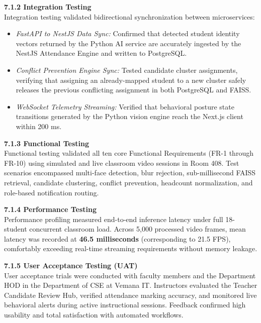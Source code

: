 \vspace{0.15in}
\noindent \textbf{7.1.2 Integration Testing} \\
Integration testing validated bidirectional synchronization between microservices:
\begin{itemize}
    \item \textit{FastAPI to NestJS Data Sync:} Confirmed that detected student identity vectors returned by the Python AI service are accurately ingested by the NestJS Attendance Engine and written to PostgreSQL.
    \item \textit{Conflict Prevention Engine Sync:} Tested candidate cluster assignments, verifying that assigning an already-mapped student to a new cluster safely releases the previous conflicting assignment in both PostgreSQL and FAISS.
    \item \textit{WebSocket Telemetry Streaming:} Verified that behavioral posture state transitions generated by the Python vision engine reach the Next.js client within 200 ms.
\end{itemize}

\vspace{0.15in}
\noindent \textbf{7.1.3 Functional Testing} \\
Functional testing validated all ten core Functional Requirements (FR-1 through FR-10) using simulated and live classroom video sessions in Room 408. Test scenarios encompassed multi-face detection, blur rejection, sub-millisecond FAISS retrieval, candidate clustering, conflict prevention, headcount normalization, and role-based notification routing.

\vspace{0.15in}
\noindent \textbf{7.1.4 Performance Testing} \\
Performance profiling measured end-to-end inference latency under full 18-student concurrent classroom load. Across 5,000 processed video frames, mean latency was recorded at \textbf{46.5 milliseconds} (corresponding to 21.5 FPS), comfortably exceeding real-time streaming requirements without memory leakage.

\vspace{0.15in}
\noindent \textbf{7.1.5 User Acceptance Testing (UAT)} \\
User acceptance trials were conducted with faculty members and the Department HOD in the Department of CSE at Vemana IT. Instructors evaluated the Teacher Candidate Review Hub, verified attendance marking accuracy, and monitored live behavioral alerts during active instructional sessions. Feedback confirmed high usability and total satisfaction with automated workflows.

